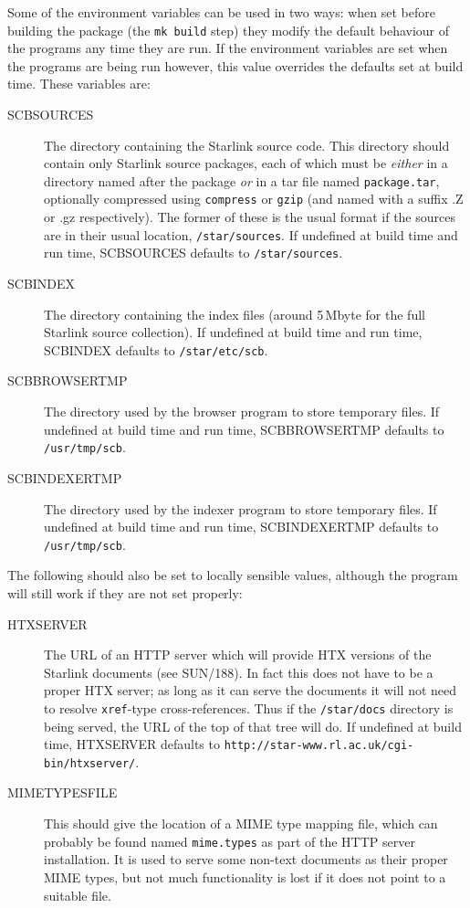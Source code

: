 \documentclass[twoside,11pt]{article}
\newcommand{\xref}[3]{#1}
\renewcommand{\_}{\texttt{\symbol{95}}}
\begin{document}
Some of the environment variables can be used in two ways:
when set before building the package (the {\tt mk build} step)
they modify the default behaviour of the programs any time they are run.  
If the environment variables are set when the programs are being
run however, this value overrides the defaults set at build time.
These variables are:
\begin{description}
\item[SCB\_SOURCES]
The directory containing the Starlink source code.  
This directory should contain only Starlink source packages,
each of which must be {\em either\/} in a directory named after the package
{\em or\/} in a tar file named {\tt package.tar}, optionally compressed
using {\tt compress} or {\tt gzip} (and named with a suffix .Z or .gz 
respectively).
The former of these is the usual format if the sources are in
their usual location, {\tt /star/sources}.
If undefined at build time and run time, SCB\_SOURCES 
defaults to {\tt /star/sources}.
\item[SCB\_INDEX]
The directory containing the index files (around 5\,Mbyte for the full
Starlink source collection).
If undefined at build time and run time, SCB\_INDEX defaults to
{\tt /star/etc/scb}.
\item[SCB\_BROWSER\_TMP]
The directory used by the browser program to store temporary files. 
If undefined at build time and run time, SCB\_BROWSER\_TMP defaults to
{\tt /usr/tmp/scb}.
\item[SCB\_INDEXER\_TMP]
The directory used by the indexer program to store temporary files. 
If undefined at build time and run time, SCB\_INDEXER\_TMP defaults to
{\tt /usr/tmp/scb}.
\end{description}
The following should also be set to locally sensible values,
although the program will still work if they are not set properly:
\begin{description}
\item[HTX\_SERVER]
The URL of an HTTP server which will provide HTX versions of the Starlink
documents (see \xref{SUN/188}{sun188}{remote_document_servers}).
In fact this does not have to be a proper HTX server; as long as it
can serve the documents it will not need to resolve {\tt xref\_}-type 
cross-references.
Thus if the {\tt /star/docs} directory is being served, the URL of
the top of that tree will do.
If undefined at build time, HTX\_SERVER defaults to 
{\tt http://star-www.rl.ac.uk/cgi-bin/htxserver/}.
\item[MIMETYPES\_FILE]
This should give the location of a MIME type mapping file,
which can probably be found named {\tt mime.types}
as part of the HTTP server installation.
It is used to serve some non-text documents as their proper MIME types,
but not much functionality is lost if it does not point to a suitable file.
\end{description}
\end{document}
